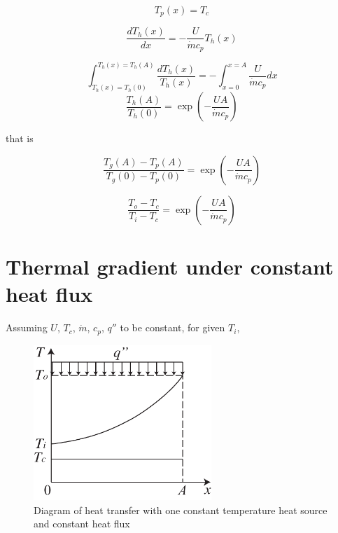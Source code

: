 \begin{equation}
T_{p}(x)=T_{c}
\end{equation}

\begin{equation}
\frac{dT_{h}(x)}{dx}=-\frac{U}{\dot{m}c_{p}}T_{h}(x)
\label{eq:T_h(x)}
\end{equation}

\begin{equation}
\int_{T_{h}(x)=T_{h}(0)}^{T_{h}(x)=T_{h}(A)}\frac{dT_{h}(x)}{T_{h}(x)}=-\int_{x=0}^{x=A}\frac{U}{\dot{m}c_{p}}dx
\end{equation}
\begin{equation}
\frac{T_{h}(A)}{T_{h}(0)}=\exp(-\frac{UA}{\dot{m}c_{p}})
\end{equation}

that is

\begin{equation}
\frac{T_{g}(A)-T_{p}(A)}{T_{g}(0)-T_{p}(0)}=\exp(-\frac{UA}{\dot{m}c_{p}})
\end{equation}

\begin{equation}
\frac{T_{o}-T_{c}}{T_{i}-T_{c}}=\exp(-\frac{UA}{\dot{m}c_{p}})
\label{eq:Eq}
\end{equation}

\chapter{Thermal gradient under constant heat flux}\label{cha:CTCHFHX}

Assuming $U$, $T_{c}$, $\dot{m}$, $c_p$, $q''$ to be constant, for
given $T_{i}$,

\begin{figure}[h]
\centering
\includegraphics[width=0.6\textwidth]{fig/CTCHFHX.pdf}\caption{Diagram of heat transfer with one constant temperature
heat source and constant heat flux}
\label{fig:CTCHFHX}
\end{figure}

